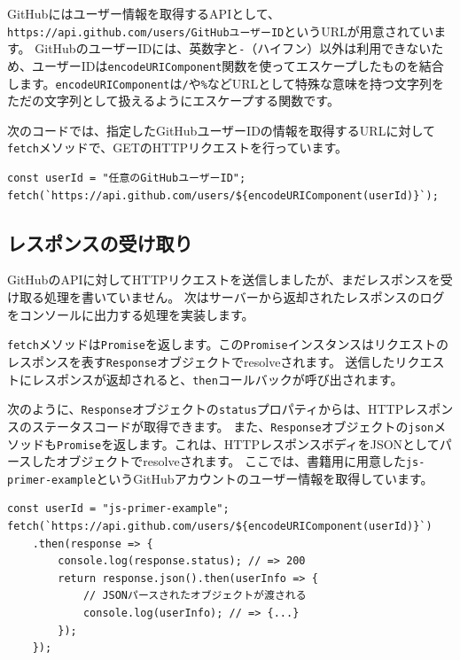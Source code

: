 GitHubにはユーザー情報を取得するAPIとして、\texttt{https://api.github.com/users/GitHubユーザーID}というURLが用意されています。
GitHubのユーザーIDには、英数字と\texttt{-}（ハイフン）以外は利用できないため、ユーザーIDは\texttt{encodeURIComponent}関数を使ってエスケープしたものを結合します。\texttt{encodeURIComponent}は\texttt{/}や\texttt{\%}などURLとして特殊な意味を持つ文字列をただの文字列として扱えるようにエスケープする関数です。

次のコードでは、指定したGitHubユーザーIDの情報を取得するURLに対して\texttt{fetch}メソッドで、GETのHTTPリクエストを行っています。

\begin{lstlisting}
const userId = "任意のGitHubユーザーID";
fetch(`https://api.github.com/users/${encodeURIComponent(userId)}`);
\end{lstlisting}

\hypertarget{receive-response}{%
\subsection{レスポンスの受け取り}\label{receive-response}}

GitHubのAPIに対してHTTPリクエストを送信しましたが、まだレスポンスを受け取る処理を書いていません。
次はサーバーから返却されたレスポンスのログをコンソールに出力する処理を実装します。

\texttt{fetch}メソッドは\texttt{Promise}を返します。この\texttt{Promise}インスタンスはリクエストのレスポンスを表す\texttt{Response}オブジェクトでresolveされます。
送信したリクエストにレスポンスが返却されると、\texttt{then}コールバックが呼び出されます。

次のように、\texttt{Response}オブジェクトの\texttt{status}プロパティからは、HTTPレスポンスのステータスコードが取得できます。
また、\texttt{Response}オブジェクトの\texttt{json}メソッドも\texttt{Promise}を返します。これは、HTTPレスポンスボディをJSONとしてパースしたオブジェクトでresolveされます。
ここでは、書籍用に用意した\texttt{js-primer-example}というGitHubアカウントのユーザー情報を取得しています。

\begin{lstlisting}
const userId = "js-primer-example";
fetch(`https://api.github.com/users/${encodeURIComponent(userId)}`)
    .then(response => {
        console.log(response.status); // => 200
        return response.json().then(userInfo => {
            // JSONパースされたオブジェクトが渡される
            console.log(userInfo); // => {...}
        });
    });
\end{lstlisting}

